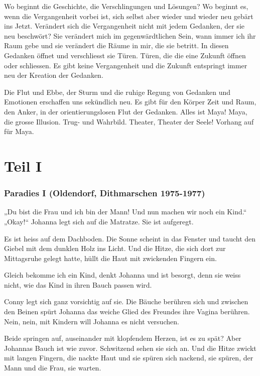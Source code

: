 Wo beginnt die Geschichte, die Verschlingungen und Lösungen? Wo beginnt es, wenn die Vergangenheit vorbei ist, sich selbst aber wieder und wieder neu gebärt ins Jetzt. Verändert sich die Vergangenheit nicht mit jedem Gedanken, der sie neu beschwört? Sie verändert mich im gegenwärdtlichen Sein, wann immer ich ihr Raum gebe und sie verändert die Räume in mir, die sie betritt. In diesen Gedanken öffnet und verschliesst sie Türen. Türen, die die eine Zukunft öffnen oder schliessen. Es gibt keine Vergangenheit und die Zukunft entspringt immer neu der Kreation der Gedanken.

Die Flut und Ebbe, der Sturm und die ruhige Regung von Gedanken und Emotionen erschaffen uns sekündlich neu. Es gibt für den Körper Zeit und Raum, den Anker, in der orientierungslosen Flut der Gedanken. Alles ist Maya! Maya, die grosse Illusion. Trug- und Wahrbild. Theater, Theater der Seele!
Vorhang auf für Maya.



\part*{Teil I}


\section*{Paradies I (Oldendorf, Dithmarschen 1975-1977)}



„Du bist die Frau und ich bin der Mann! Und nun machen wir noch ein Kind.“ „Okay!“ Johanna legt sich auf die Matratze. Sie ist aufgeregt.

Es ist heiss auf dem Dachboden. Die Sonne scheint in das Fenster und taucht den Giebel mit dem dunklen Holz ins Licht. Und die Hitze, die sich dort zur Mittagsruhe gelegt hatte, hüllt die Haut mit zwickenden Fingern ein.

Gleich bekomme ich ein Kind, denkt Johanna und ist besorgt, denn sie weiss nicht, wie das Kind in ihren Bauch passen wird.

Conny legt sich ganz vorsichtig auf sie. Die Bäuche berühren sich und zwischen den Beinen spürt Johanna das weiche Glied des Freundes ihre Vagina berühren. Nein, nein, mit Kindern will Johanna es nicht versuchen.

Beide springen auf, auseinander mit klopfendem Herzen, ist es zu spät? Aber Johannas Bauch ist wie zuvor. Schwitzend sehen sie sich an. Und die Hitze zwickt mit langen Fingern, die nackte Haut und sie spüren sich nackend, sie spüren, der Mann und die Frau, sie warten.

